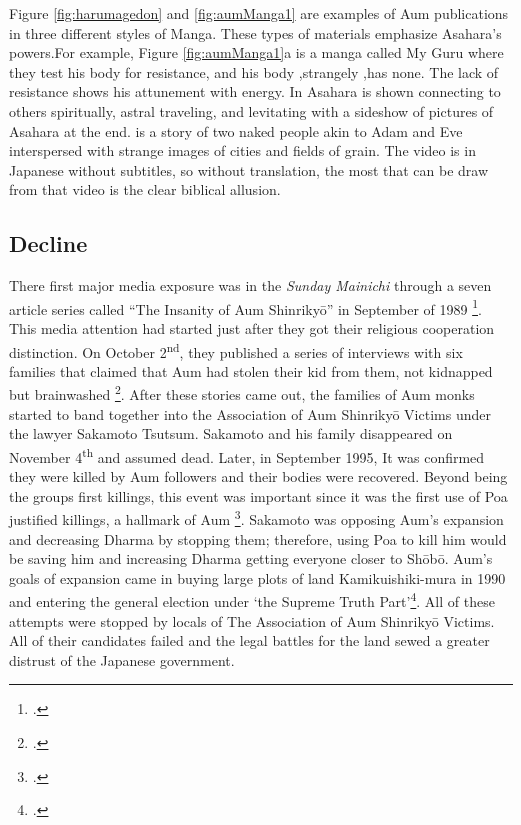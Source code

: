 \documentclass[12pt, letterpaper]{article}
\newcommand{\sorta}[1]{`#1'}
\newcommand{\poses}[1]{#1's}
\newcommand{\say}[1]{``#1''}
\begin{document}
Figure \ref{fig:harumagedon} and \ref{fig:aumManga1} are examples of Aum publications in three different
styles of Manga. These types of materials emphasize \poses{Asahara} powers.For example, Figure
\ref{fig:aumManga1}a is a manga called My Guru where they test his body for resistance, and his
body ,strangely ,has none. The lack of resistance shows his attunement with energy. In  Asahara is shown connecting to others spiritually,
astral traveling, and levitating with a sideshow of pictures of Asahara at the end.
 is a story of two naked people akin to Adam and Eve interspersed with
strange images of cities and fields of grain. The video is in Japanese without subtitles, so without
translation, the most that can be draw from that video is the clear biblical allusion.

\subsection{Decline}
There first major media exposure was in the \textit{Sunday Mainichi} through a seven article series called \say{The Insanity of Aum
  Shinriky\=o} in September of 1989 \footcite[35]{watanabe_reactions_1997}. This media attention had started
just after they got their religious cooperation distinction. On October  2\textsuperscript{nd}, they
published a series of interviews with six families that claimed that Aum had stolen their kid from them, not
kidnapped but brainwashed \footcite[184]{hardacre_aum_2007}. After these stories came out, the families of
Aum monks started to band together into the Association of Aum Shinriky\=o Victims under the lawyer Sakamoto
Tsutsum. Sakamoto and his family disappeared on November 4\textsuperscript{th} and assumed dead. Later, in
September 1995, It was confirmed they were killed by Aum
followers and their bodies were recovered. Beyond being the groups first killings, this event was important
since it was the first use of Poa justified killings, a hallmark of Aum 
\footcite[89]{watanabe_religion_1998}. Sakamoto was opposing \poses{Aum} expansion and decreasing Dharma by
stopping them; therefore, using Poa to kill him would be saving him and increasing Dharma getting everyone
closer to Sh\=ob\=o. \poses{Aum} goals of expansion came in buying large plots of land Kamikuishiki-mura in
1990 and entering the general election under \sorta{the Supreme Truth Part}\footcite[187]{hardacre_aum_2007}.
All of these attempts were stopped by locals of The Association of Aum Shinriky\=o Victims. All of their
candidates failed and the legal battles for the land sewed a greater distrust of the Japanese government.
\end{document}
